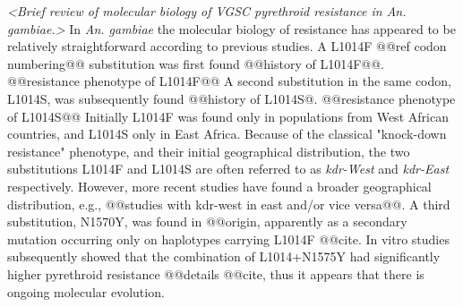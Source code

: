 \documentclass[a4paper,11pt,abstracton,hidelinks]{scrartcl}
\begin{document}
\textit{<Brief review of molecular biology of VGSC pyrethroid resistance in An. gambiae.>}
%
In \textit{An. gambiae} the molecular biology of resistance has appeared to be relatively straightforward according to previous studies.
%
A L1014F @@ref codon numbering@@ substitution was first found @@history of L1014F@@.
%
@@resistance phenotype of L1014F@@
%
A second substitution in the same codon, L1014S, was subsequently found @@history of L1014S@.
%
@@resistance phenotype of L1014S@@
%
Initially L1014F was found only in populations from West African countries, and L1014S only in East Africa.
%
Because of the classical "knock-down resistance" phenotype, and their initial geographical distribution, the two substitutions L1014F and L1014S are often referred to as \textit{kdr-West} and \textit{kdr-East} respectively.
%
However, more recent studies have found a broader geographical distribution, e.g., @@studies with kdr-west in east and/or vice versa@@.
%
A third substitution, N1570Y, was found in @@origin, apparently as a secondary mutation occurring only on haplotypes carrying L1014F @@cite.
%
In vitro studies subsequently showed that the combination of L1014+N1575Y had significantly higher pyrethroid resistance @@details @@cite, thus it appears that there is ongoing molecular evolution.
\end{document}
